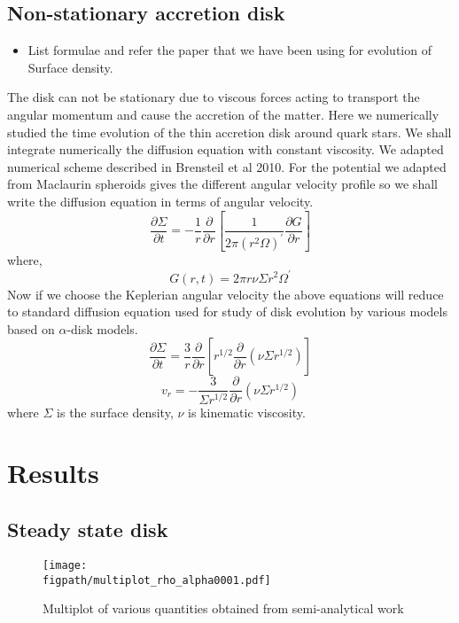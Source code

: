 \documentclass[useAMS,usenatbib]{mn2e}
\newcommand{\figpath}{./Figs/}
\begin{document}
\subsection{Non-stationary accretion disk}
\begin{itemize}
\item List formulae and refer the paper that we have been using for
  evolution of Surface density. 
\end{itemize}
The disk can not be stationary due to viscous forces acting to transport the angular momentum and cause the accretion of the matter. Here we numerically studied the time evolution of the thin accretion disk around quark stars. We shall integrate numerically the diffusion equation with constant viscosity. We adapted numerical scheme described in Brensteil et al 2010. For the potential we adapted from Maclaurin spheroids gives the different angular velocity profile so we shall write the diffusion equation in terms of angular velocity.
\begin{equation}
\frac{\partial\Sigma}{\partial t} = -\frac{1}{r}\frac{\partial}{\partial r}\left[\frac{1}{2\pi(r^2\Omega)^\prime}\frac{\partial G}{\partial r}\right]
\end{equation}
where,
\begin{equation}
G(r,t) = 2\pi r\nu\Sigma r^2 \Omega^\prime 
\end{equation}
Now if we choose the Keplerian angular velocity the above equations will reduce to standard diffusion equation used for study of disk evolution by various models based on $\alpha$-disk models.
\begin{equation}
\frac{\partial\Sigma}{\partial t} = \frac{3}{r}\frac{\partial}{\partial r}\left[r^{1/2}\frac{\partial}{\partial r}\left(\nu\Sigma r^{1/2}\right)\right]
\end{equation}
\begin{equation}
v_r = -\frac{3}{\Sigma r^{1/2}}\frac{\partial}{\partial r}\left(\nu\Sigma r^{1/2}\right)
\end{equation}
where $\Sigma$ is the surface density, $\nu$ is kinematic viscosity.

\section{Results}
\subsection{Steady state disk}
\begin{figure}
\centering
\texttt{[image: \\figpath/multiplot\_rho\_alpha0001.pdf]}
\caption{Multiplot of various quantities obtained from semi-analytical
  work}
\label{fig:steadyplt1}
\end{figure}
\end{document}

